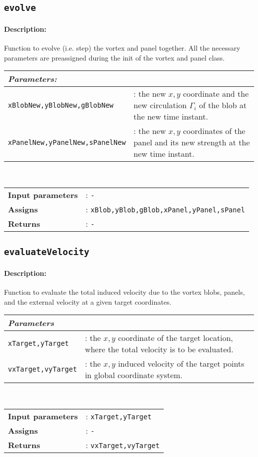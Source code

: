\subsection{\texttt{evolve}}
	\paragraph{Description:} Function to evolve (i.e. step) the vortex and panel together. All the necessary parameters are preassigned during the init of the vortex and panel class.\\
	
	    \begin{tabular}{lp{10cm}}
			\textit{Parameters:} & \\ \hline
			 \texttt{xBlobNew,yBlobNew,gBlobNew} &: the new $x,y$ coordinate and the new circulation $\Gamma_i$ of the blob at the new time instant.\\
			\texttt{xPanelNew,yPanelNew,sPanelNew} &: the new $x,y$ coordinates of the panel and its new strength at the new time instant.\\
		\end{tabular} \vspace{5 mm}
	\\		
	\begin{tabular}{lp{10cm}}
		\textbf{Input parameters} &: \texttt{-}\\ 
		\textbf{Assigns} &: \texttt{xBlob,yBlob,gBlob,xPanel,yPanel,sPanel}\\ 			
		\textbf{Returns} &: \texttt{-}\\ 					
	\end{tabular}

\subsection{\texttt{evaluateVelocity}}
	\paragraph{Description:} Function to evaluate the total induced velocity due to the vortex blobs, panels, and the external velocity at a given target coordinates.\\
	
	    \begin{tabular}{lp{10cm}}
			\textit{Parameters} & \\ \hline
			 \texttt{xTarget,yTarget} &: the $x,y$ coordinate of the target location, where the total velocity is to be evaluated.\\
			\texttt{vxTarget,vyTarget} &: the $x,y$ induced velocity of the target points in global coordinate system.\\
		\end{tabular} \vspace{5 mm}
	\\		
	\begin{tabular}{lp{10cm}}
		\textbf{Input parameters} &: \texttt{xTarget,yTarget}\\ 
		\textbf{Assigns} &: \texttt{-}\\ 			
		\textbf{Returns} &: \texttt{vxTarget,vyTarget}\\ 					
	\end{tabular}
		
